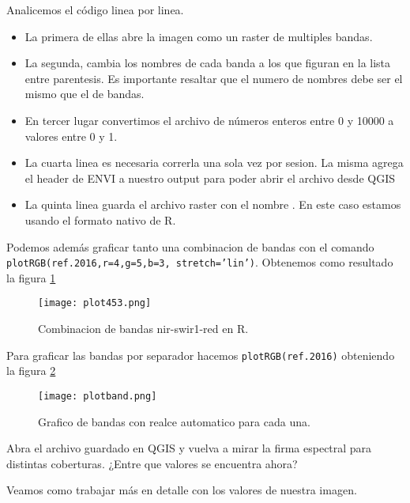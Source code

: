 \begin{exa}
    Analicemos el c\'odigo linea por linea.
    \begin{itemize}
    \item La primera de ellas abre la imagen como  un raster de multiples bandas.
    \item La segunda, cambia los nombres de cada banda a los que figuran en la
          lista entre parentesis. Es importante resaltar que el numero de nombres
          debe ser el mismo que el de bandas.
    \item En tercer lugar convertimos el archivo de n\'umeros enteros entre 0 y
          10000 a valores entre 0 y 1.
    \item La cuarta linea es necesaria correrla una sola vez por sesion. La misma
          agrega el header de ENVI a nuestro output para poder abrir el archivo
          desde QGIS
      \item La quinta linea guarda el archivo raster con el nombre 
          . En este caso estamos usando el formato nativo de R.
    \end{itemize}
    Podemos adem\'as graficar tanto una combinacion de bandas con el comando
    \texttt{plotRGB(ref.2016,r=4,g=5,b=3, stretch='lin')}. Obtenemos como resultado
    la figura \ref{fig:plot453}
    \begin{figure}[h!]
    \begin{center}
        \texttt{[image: plot453.png]}
    \end{center}
    \caption{Combinacion de bandas nir-swir1-red en R.}
    \label{fig:plot453}
    \end{figure}
    Para graficar las bandas por separador hacemos \texttt{plotRGB(ref.2016)}
    obteniendo la figura \ref{fig:plotband}
    \begin{figure}[h!]
    \begin{center}
        \texttt{[image: plotband.png]}
    \end{center}
    \caption{Grafico de bandas con realce automatico para cada una.}
    \label{fig:plotband}
    \end{figure}

\end{exa}

\begin{act}
   Abra el archivo guardado en QGIS y vuelva a mirar la firma espectral para
   distintas coberturas. ¿Entre que valores se encuentra ahora?
\end{act}

Veamos como trabajar m\'as en detalle con los valores de nuestra imagen.

